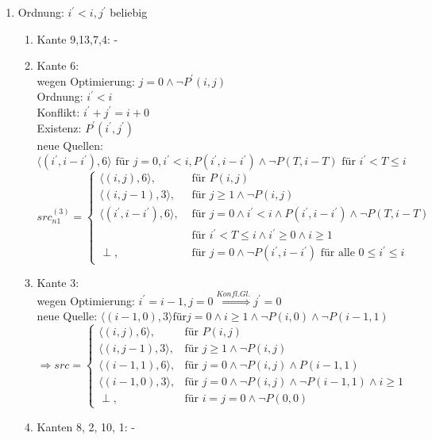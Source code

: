 \begin{enumerate}
      \item {Ordnung: \(i^\prime < i, j^\prime\) beliebig
          \begin{enumerate}
            \item Kante 9,13,7,4: -
            \item Kante 6: \\
              wegen Optimierung: \(j= 0 \land \neg P^\prime (i,j)\) \\
              Ordnung: \(i^\prime < i \) \\
              Konflikt: \( i^\prime + j^\prime = i + 0 \) \\
              Existenz: \( P^\prime(i^\prime, j^\prime) \) \\
              neue Quellen: \( \langle ( i^\prime, i-i^\prime ), 6 \rangle \text{ für } j=0, i^\prime < i , P(i^\prime, i - i ^\prime) \land \neg P(T, i-T) \text{ für } i^\prime < T \leq i \) \\

\( src^{(3)}_{n1} =
\begin{cases}
  \langle (i,j), 6 \rangle, & \mbox{ für } P(i,j) \\
  \langle (i,j-1), 3 \rangle, & \mbox{ für } j \geq 1 \land \neg P (i,j) \\
  \langle (i^\prime, i-i^\prime),6 \rangle, & \mbox{ für } j=0 \land i^\prime < i \land P(i^\prime, i - i^\prime) \land \neg P(T,i-T) \\ & \mbox{ für } i^\prime < T \leq i \land i^\prime \geq 0 \land i \geq 1 \\
  \perp, & \mbox{ für } j=0 \land \neg P(i^\prime, i - i^\prime) \text{ für alle } 0 \leq i^\prime \leq i
\end{cases} \)

\item Kante 3:\\
  wegen Optimierung: \( i^\prime = i - 1, j=0 \stackrel{Konfl. Gl.}{\Rightarrow} j^\prime = 0\) \\
  neue Quelle: \( \langle (i-1,0), 3 \rangle \text{für} j=0 \land i \geq 1 \land \neg P(i,0) \land \neg P(i-1,1) \) \\
\( \Rightarrow src =
\begin{cases}
  \langle (i, j), 6 \rangle, & \mbox{für } P(i,j) \\
  \langle (i, j-1), 3 \rangle, & \mbox{für } j \geq 1 \land \neg P(i,j) \\
  \langle (i-1, 1), 6 \rangle, & \mbox{für } j=0 \land \neg P(i,j) \land P(i-1,1) \\
  \langle (i-1, 0), 3 \rangle, & \mbox{für } j=0 \land \neg P(i,j) \land \neg P(i-1,1) \land i \geq 1 \\
  \perp, & \mbox{für } i=j=0 \land \neg P(0,0)
\end{cases}
\)
\item Kanten 8, 2, 10, 1: -
           \end{enumerate}
           }

\end{enumerate}
